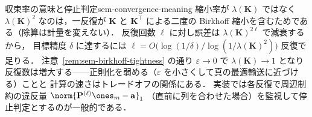 \begin{remark}{収束率の意味と停止判定}{sem-convergence-meaning}
  縮小率が $\lambda(\mathbf{K})$ ではなく $\lambda(\mathbf{K})^2$ なのは，一反復が $\mathbf{K}$ と
  $\mathbf{K}^\top$ による二度の Birkhoff 縮小を含むためである（除算は計量を変えない）．
  反復回数 $\ell$ に対し誤差は $\lambda(\mathbf{K})^{2\ell}$ で減衰するから，
  目標精度 $\delta$ に達するには $\ell = O\bigl(\log(1/\delta) / \log(1/\lambda(\mathbf{K})^2)\bigr)$ 反復で足りる．
  注意~\ref{rem:sem-birkhoff-tightness} の通り $\varepsilon \to 0$ で $\lambda(\mathbf{K}) \to 1$ となり
  反復数は増大する——正則化を弱める（$\varepsilon$ を小さくして真の最適輸送に近づける）ことと
  計算の速さはトレードオフの関係にある．
  実装では各反復で周辺制約の違反量 $\norm{\mathbf{P}^{(\ell)}\ones_m - \mathbf{a}}_1$
  （直前に列を合わせた場合）を監視して停止判定とするのが一般的である．
\end{remark}
